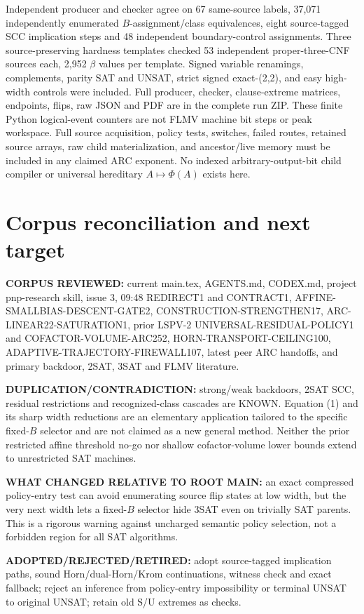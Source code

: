 \documentclass[11pt]{article}
\begin{document}
Independent producer and checker agree on 67 same-source labels, 37,071 independently enumerated $B$-assignment/class equivalences, eight source-tagged SCC implication steps and 48 independent boundary-control assignments. Three source-preserving hardness templates checked 53 independent proper-three-CNF sources each, 2,952 $\beta$ values per template. Signed variable renamings, complements, parity SAT and UNSAT, strict signed exact-(2,2), and easy high-width controls were included. Full producer, checker, clause-extreme matrices, endpoints, flips, raw JSON and PDF are in the complete run ZIP. These finite Python logical-event counters are not FLMV machine bit steps or peak workspace. Full source acquisition, policy tests, switches, failed routes, retained source arrays, raw child materialization, and ancestor/live memory must be included in any claimed ARC exponent. No indexed arbitrary-output-bit child compiler or universal hereditary $A\mapsto\Phi(A)$ exists here.

\section{Corpus reconciliation and next target}
\textbf{CORPUS REVIEWED:} current main.tex, AGENTS.md, CODEX.md, project pnp-research skill, issue 3, 09:48 REDIRECT1 and CONTRACT1, AFFINE-SMALLBIAS-DESCENT-GATE2, CONSTRUCTION-STRENGTHEN17, ARC-LINEAR22-SATURATION1, prior LSPV-2 UNIVERSAL-RESIDUAL-POLICY1 and COFACTOR-VOLUME-ARC252, HORN-TRANSPORT-CEILING100, ADAPTIVE-TRAJECTORY-FIREWALL107, latest peer ARC handoffs, and primary backdoor, 2SAT, 3SAT and FLMV literature.

\textbf{DUPLICATION/CONTRADICTION:} strong/weak backdoors, 2SAT SCC, residual restrictions and recognized-class cascades are KNOWN. Equation (1) and its sharp width reductions are an elementary application tailored to the specific fixed-$B$ selector and are not claimed as a new general method. Neither the prior restricted affine threshold no-go nor shallow cofactor-volume lower bounds extend to unrestricted SAT machines.

\textbf{WHAT CHANGED RELATIVE TO ROOT MAIN:} an exact compressed policy-entry test can avoid enumerating source flip states at low width, but the very next width lets a fixed-$B$ selector hide 3SAT even on trivially SAT parents. This is a rigorous warning against uncharged semantic policy selection, not a forbidden region for all SAT algorithms.

\textbf{ADOPTED/REJECTED/RETIRED:} adopt source-tagged implication paths, sound Horn/dual-Horn/Krom continuations, witness check and exact fallback; reject an inference from policy-entry impossibility or terminal UNSAT to original UNSAT; retain old S/U extremes as checks.
\end{document}
